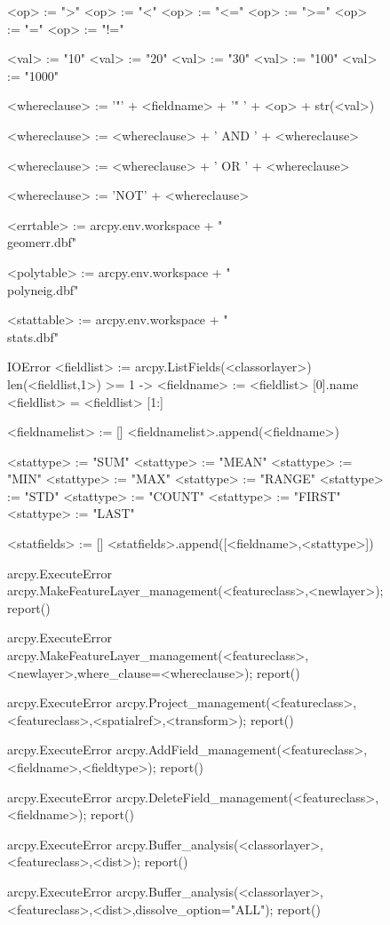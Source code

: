 \begin{figure}
{\begin{code}
<op> := ">"
<op> := "<"
<op> := "<="
<op> := ">="
<op> := "="
<op> := "!="

<val> := "10"
<val> := "20"
<val> := "30"
<val> := "100"
<val> := "1000"

<whereclause> := '"' + <fieldname> + '" ' + <op> + str(<val>)

<whereclause> := <whereclause> + ' AND ' + <whereclause>

<whereclause> := <whereclause> + ' OR ' +  <whereclause>

<whereclause> := 'NOT' + <whereclause>

<errtable> := arcpy.env.workspace + "\\geomerr.dbf"

<polytable> := arcpy.env.workspace + "\\polyneig.dbf"

<stattable> := arcpy.env.workspace + "\\stats.dbf"

{IOError} <fieldlist> := arcpy.ListFields(<classorlayer>)
len(<fieldlist,1>) >= 1 -> <fieldname> := <fieldlist> [0].name
<fieldlist> = <fieldlist> [1:]

<fieldnamelist> := []
<fieldnamelist>.append(<fieldname>)

<stattype> := "SUM"
<stattype> := "MEAN"
<stattype> := "MIN"
<stattype> := "MAX"
<stattype> := "RANGE"
<stattype> := "STD"
<stattype> := "COUNT"
<stattype> := "FIRST"
<stattype> := "LAST"

<statfields> := []
<statfields>.append([<fieldname>,<stattype>])

{arcpy.ExecuteError} arcpy.MakeFeatureLayer\_management(<featureclass>,<newlayer>); report()

{arcpy.ExecuteError} arcpy.MakeFeatureLayer\_management(<featureclass>,<newlayer>,where\_clause=<whereclause>); report()

{arcpy.ExecuteError} arcpy.Project\_management(<featureclass>,<featureclass>,<spatialref>,<transform>); report()

{arcpy.ExecuteError} arcpy.AddField\_management(<featureclass>,<fieldname>,<fieldtype>); report()

{arcpy.ExecuteError} arcpy.DeleteField\_management(<featureclass>,<fieldname>); report()

{arcpy.ExecuteError} arcpy.Buffer\_analysis(<classorlayer>,<featureclass>,<dist>); report()

{arcpy.ExecuteError} arcpy.Buffer\_analysis(<classorlayer>,<featureclass>,<dist>,dissolve\_option="ALL"); report()


\end{code}}
\end{figure}
